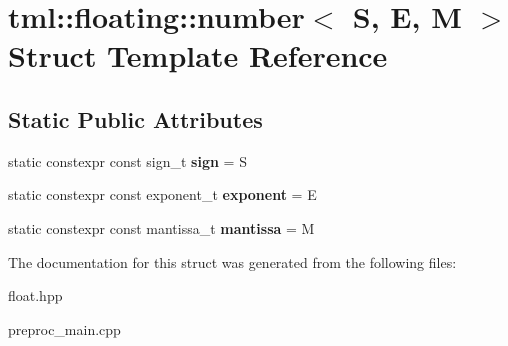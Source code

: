 \hypertarget{structtml_1_1floating_1_1number}{\section{tml\+:\+:floating\+:\+:number$<$ S, E, M $>$ Struct Template Reference}
\label{structtml_1_1floating_1_1number}
}
\subsection*{Static Public Attributes}
\begin{DoxyCompactItemize}
\item 
\hypertarget{structtml_1_1floating_1_1number_a262b4d49a64923c50751067df83c3164}{static constexpr const sign\+\_\+t {\bfseries sign} = S}\label{structtml_1_1floating_1_1number_a262b4d49a64923c50751067df83c3164}

\item 
\hypertarget{structtml_1_1floating_1_1number_a7b897ab6a6a40ad919e5d7aed1d42c7c}{static constexpr const exponent\+\_\+t {\bfseries exponent} = E}\label{structtml_1_1floating_1_1number_a7b897ab6a6a40ad919e5d7aed1d42c7c}

\item 
\hypertarget{structtml_1_1floating_1_1number_a926c346910a250fff03ac48ffa16d468}{static constexpr const mantissa\+\_\+t {\bfseries mantissa} = M}\label{structtml_1_1floating_1_1number_a926c346910a250fff03ac48ffa16d468}

\end{DoxyCompactItemize}


The documentation for this struct was generated from the following files\+:\begin{DoxyCompactItemize}
\item 
float.\+hpp\item 
preproc\+\_\+main.\+cpp\end{DoxyCompactItemize}
